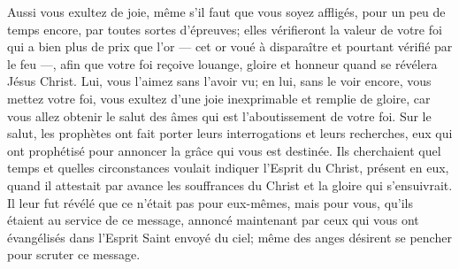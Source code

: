 Aussi vous exultez de joie,
	même s’il faut que vous soyez affligés, pour un peu de temps encore,
	par toutes sortes d’épreuves;
	elles vérifieront la valeur de votre foi qui a bien plus de prix que l’or
	--- cet or voué à disparaître et pourtant vérifié par le feu ---,
	afin que votre foi reçoive louange, gloire et honneur
	quand se révélera Jésus Christ.
Lui, vous l’aimez sans l’avoir vu;
	en lui, sans le voir encore, vous mettez votre foi,
	vous exultez d’une joie inexprimable et remplie de gloire,
	car vous allez obtenir le salut des âmes
	qui est l’aboutissement de votre foi.
Sur le salut,
		les prophètes ont fait porter leurs interrogations et leurs recherches,
	eux qui ont prophétisé pour annoncer la grâce qui vous est destinée.
Ils cherchaient quel temps et quelles circonstances
		voulait indiquer l’Esprit du Christ, présent en eux,
	quand il attestait par avance les souffrances du Christ
	et la gloire qui s’ensuivrait.
Il leur fut révélé que ce n’était pas pour eux-mêmes, mais pour vous,
	qu’ils étaient au service de ce message,
	annoncé maintenant par ceux qui vous ont évangélisés
		dans l’Esprit Saint envoyé du ciel;
	même des anges désirent se pencher pour scruter ce message.
